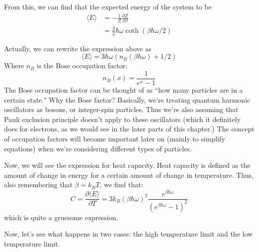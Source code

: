 \documentclass[12pt]{article}
\begin{document}
From this, we can find that the expected energy of the system to be
\begin{align*}
    \langle E \rangle&=-\frac{1}{Z}\frac{\partial Z}{\partial\beta}\\
    &=\frac{3}{2}\hbar\omega\coth{(\beta\hbar\omega/2)}
\end{align*}

Actually, we can rewrite the expression above as 
\begin{equation*}
    \langle E\rangle=3\hbar\omega(n_B(\beta\hbar\omega)+1/2)
\end{equation*}
Where $n_B$ is the Bose occupation factor:
\begin{equation*}
    n_B(x)=\frac{1}{e^x-1}
\end{equation*}
The Bose occupation factor can be thought of as ``how many particles are in a certain state." 
\newpage
Why the Bose factor? Basically, we're treating quantum harmonic oscillators as bosons, or integer-spin particles. Thus we're also assuming that Pauli exclusion principle doesn't apply to these oscillators (which it definitely does for electrons, as we would see in the later parts of this chapter.) The concept of occupation factors will become important later on (mainly to simplify equations) when we're considering different types of particles.

\vspace{0.25 in}

Now, we will see the expression for heat capacity. Heat capacity is defined as the amount of change in energy for a certain amount of change in temperature. Thus, also remembering that $\beta=k_BT$, we find that:
\begin{equation*}
    C=\frac{\partial\langle E\rangle}{\partial T}=3k_B(\beta\hbar\omega)^2\frac{e^{\beta\hbar\omega}}{(e^{\beta\hbar\omega}-1)^2}
\end{equation*}
which is quite a gruesome expression.
\vspace{0.25 in}

Now, let's see what happens in two cases: the high temperature limit and the low temperature limit.
\end{document}
